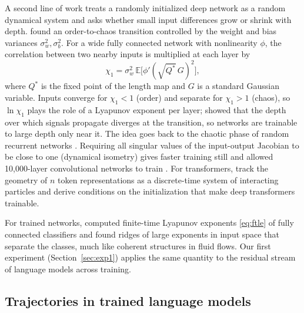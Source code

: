A second line of work treats a randomly initialized deep network as a random dynamical system and asks whether small input differences grow or shrink with depth. \citet{poole2016exponential} found an order-to-chaos transition controlled by the weight and bias variances $\sigma_w^2,\sigma_b^2$. For a wide fully connected network with nonlinearity $\phi$, the correlation between two nearby inputs is multiplied at each layer by
\begin{equation}
\chi_1=\sigma_w^2\,\mathbb{E}\big[\phi'(\sqrt{Q^\ast}\,G)^2\big] ,
\label{eq:chi1}
\end{equation}
where $Q^\ast$ is the fixed point of the length map and $G$ is a standard Gaussian variable. Inputs converge for $\chi_1<1$ (order) and separate for $\chi_1>1$ (chaos), so $\ln\chi_1$ plays the role of a Lyapunov exponent per layer; \citet{schoenholz2016deep} showed that the depth over which signals propagate diverges at the transition, so networks are trainable to large depth only near it. The idea goes back to the chaotic phase of random recurrent networks \citep{sompolinsky1988chaos}. Requiring all singular values of the input-output Jacobian to be close to one (dynamical isometry) gives faster training still \citep{pennington2017resurrecting} and allowed 10{,}000-layer convolutional networks to train \citep{xiao2018dynamical}. For transformers, \citet{cowsik2024geometric} track the geometry of $n$ token representations as a discrete-time system of interacting particles and derive conditions on the initialization that make deep transformers trainable.

For trained networks, \citet{storm2023finitetime} computed finite-time Lyapunov exponents \eqref{eq:ftle} of fully connected classifiers and found ridges of large exponents in input space that separate the classes, much like coherent structures in fluid flows. Our first experiment (Section~\ref{sec:exp1}) applies the same quantity to the residual stream of language models across training.

\subsection{Trajectories in trained language models}

